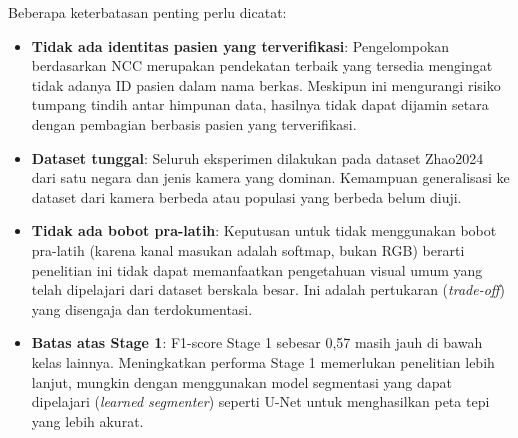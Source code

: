 Beberapa keterbatasan penting perlu dicatat:

\begin{itemize}
    \item \textbf{Tidak ada identitas pasien yang terverifikasi}: Pengelompokan berdasarkan NCC
    merupakan pendekatan terbaik yang tersedia mengingat tidak adanya ID pasien dalam nama
    berkas. Meskipun ini mengurangi risiko tumpang tindih antar himpunan data, hasilnya tidak
    dapat dijamin setara dengan pembagian berbasis pasien yang terverifikasi.
    \item \textbf{Dataset tunggal}: Seluruh eksperimen dilakukan pada dataset Zhao2024 dari
    satu negara dan jenis kamera yang dominan. Kemampuan generalisasi ke dataset dari kamera
    berbeda atau populasi yang berbeda belum diuji.
    \item \textbf{Tidak ada bobot pra-latih}: Keputusan untuk tidak menggunakan bobot pra-latih
    (karena kanal masukan adalah softmap, bukan RGB) berarti penelitian ini tidak dapat
    memanfaatkan pengetahuan visual umum yang telah dipelajari dari dataset berskala besar.
    Ini adalah pertukaran (\textit{trade-off}) yang disengaja dan terdokumentasi.
    \item \textbf{Batas atas Stage 1}: F1-score Stage 1 sebesar 0,57 masih jauh di bawah
    kelas lainnya. Meningkatkan performa Stage 1 memerlukan penelitian lebih lanjut, mungkin
    dengan menggunakan model segmentasi yang dapat dipelajari (\textit{learned segmenter})
    seperti U-Net \citep{Ronneberger2015} untuk menghasilkan peta tepi yang lebih akurat.
\end{itemize}
